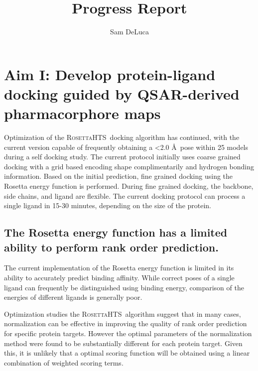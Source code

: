 \documentclass[11pt, oneside]{article}   	%
\title{Progress Report}
\author{Sam DeLuca}
\newcommand{\rhts}{\textsc{RosettaHTS}\ }
\begin{document}
\maketitle
\section{Aim I: Develop protein-ligand docking guided by QSAR-derived pharmacorphore maps}
Optimization of the \rhts docking algorithm has continued, with the current version capable of frequently obtaining a \textless 2.0 \AA\ pose within 25 models during a self docking study.
The current protocol initially uses coarse grained docking with a grid based encoding shape complimentarily and hydrogen bonding information.  
Based on the initial prediction, fine grained docking using the Rosetta energy function is performed.  
During fine grained docking, the backbone, side chains, and ligand are flexible. 
The current docking protocol can process a single ligand in 15-30 minutes, depending on the size of the protein.

\subsection{The Rosetta energy function has a limited ability to perform rank order prediction.}
The current implementation of the Rosetta energy function is limited in its ability to accurately predict binding affinity.
While correct poses of a single ligand can frequently be distinguished using binding energy\citep{Davis:2009fx}, comparison of the energies of different ligands is generally poor\citep{Kaufmann:2009cq}.

Optimization studies the \rhts algorithm suggest that in many cases, normalization can be effective in improving the quality of rank order prediction for specific protein targets.  
However the optimal parameters of the normalization method were found to be substantially different for each protein target.  
Given this, it is unlikely that a optimal scoring function will be obtained using a linear combination of weighted scoring terms. 
\end{document}
